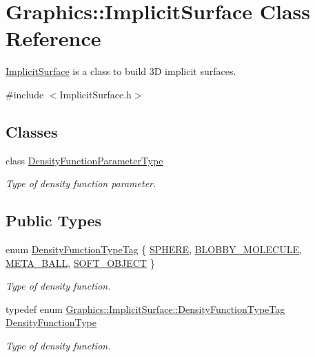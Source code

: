 \hypertarget{class_graphics_1_1_implicit_surface}{
\section{Graphics::ImplicitSurface Class Reference}
\label{class_graphics_1_1_implicit_surface}
}


\hyperlink{class_graphics_1_1_implicit_surface}{ImplicitSurface} is a class to build 3D implicit surfaces.  




{\ttfamily \#include $<$ImplicitSurface.h$>$}

\subsection*{Classes}
\begin{DoxyCompactItemize}
\item 
class \hyperlink{class_graphics_1_1_implicit_surface_1_1_density_function_parameter_type}{DensityFunctionParameterType}
\begin{DoxyCompactList}\small\item\em Type of density function parameter. \end{DoxyCompactList}\end{DoxyCompactItemize}
\subsection*{Public Types}
\begin{DoxyCompactItemize}
\item 
enum \hyperlink{class_graphics_1_1_implicit_surface_a1dde2f9d67e9dd29c337f90d67e1fa0b}{DensityFunctionTypeTag} \{ \hyperlink{class_graphics_1_1_implicit_surface_a1dde2f9d67e9dd29c337f90d67e1fa0ba79788d80f9e0fdf80162c83dfc55826c}{SPHERE}, 
\hyperlink{class_graphics_1_1_implicit_surface_a1dde2f9d67e9dd29c337f90d67e1fa0ba70389a0db79665009552edacfb62ba7b}{BLOBBY\_\-MOLECULE}, 
\hyperlink{class_graphics_1_1_implicit_surface_a1dde2f9d67e9dd29c337f90d67e1fa0bab3ab6530bfc96df5ccacedbfa924b594}{META\_\-BALL}, 
\hyperlink{class_graphics_1_1_implicit_surface_a1dde2f9d67e9dd29c337f90d67e1fa0ba0fcef34d3d76751b72a7d7736c83c2a7}{SOFT\_\-OBJECT}
 \}
\begin{DoxyCompactList}\small\item\em Type of density function. \end{DoxyCompactList}\item 
typedef enum \hyperlink{class_graphics_1_1_implicit_surface_a1dde2f9d67e9dd29c337f90d67e1fa0b}{Graphics::ImplicitSurface::DensityFunctionTypeTag} \hyperlink{class_graphics_1_1_implicit_surface_ab19cb1eb5b21daefd95b6d007be5c199}{DensityFunctionType}
\begin{DoxyCompactList}\small\item\em Type of density function. \end{DoxyCompactList}\end{DoxyCompactItemize}
